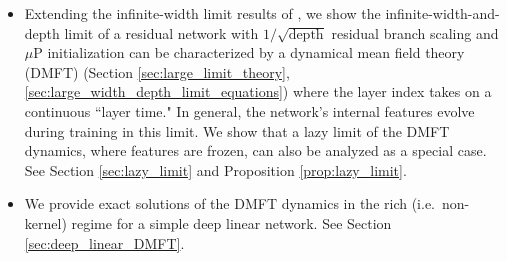 \documentclass{article} %
\begin{document}
\begin{itemize}

\item Extending the infinite-width limit results of \citet{bordelon2022self}, we show the infinite-width-and-depth limit of a residual network with $1/\sqrt{\text{depth}}$ residual branch scaling and $\mu$P initialization can be characterized by a dynamical mean field theory (DMFT) (Section \ref{sec:large_limit_theory}, \ref{sec:large_width_depth_limit_equations}) where the layer index takes on a continuous ``layer time." In general, the network's internal features evolve during training in this limit. 
% 
We show that a lazy limit of the DMFT dynamics, where features are frozen, can also be analyzed as a special case. See Section \ref{sec:lazy_limit} and Proposition \ref{prop:lazy_limit}. 

\item We provide exact solutions of the DMFT dynamics in the rich (i.e.~non-kernel) regime for a simple deep linear network. See Section \ref{sec:deep_linear_DMFT}.
\end{itemize}

% 
% 
% 

% 
% 
% 
\end{document}
